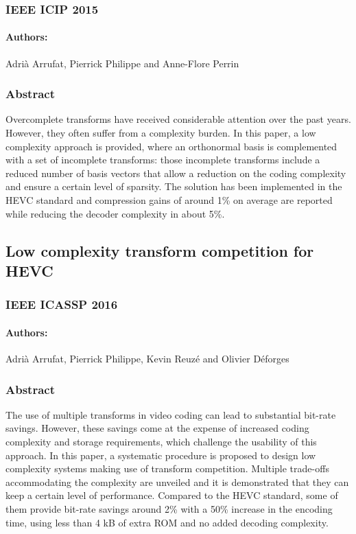 \documentclass[11pt,a4paper,openright,twoside]{book}
\numberwithin{equation}{section} %
\numberwithin{figure}{section} %
\numberwithin{table}{section} %
\begin{document}
\subsubsection*{IEEE ICIP 2015}
\paragraph{\textsf{Authors:}}
	Adrià Arrufat, Pierrick Philippe and Anne-Flore Perrin
\subsubsection*{Abstract}

Overcomplete transforms have received considerable attention over the past
years.
However, they often suffer from a complexity burden.
In this paper, a low complexity approach is provided, where an orthonormal
basis is complemented with a set of incomplete transforms: those incomplete
transforms include a reduced number of basis vectors that allow a reduction on
the coding complexity and ensure a certain level of sparsity.
The solution has been implemented in the \acs{HEVC}  standard and compression
gains of around 1\% on average are reported while reducing the decoder
complexity in about 5\%.

\subsection*{Low complexity transform competition for HEVC}
\subsubsection{IEEE ICASSP 2016}
\paragraph{\textsf{Authors:}}
	Adrià Arrufat, Pierrick Philippe, Kevin Reuzé and Olivier Déforges
\subsubsection*{Abstract}

The use of multiple transforms in video coding can lead to substantial
bit-rate savings.
However, these savings come at the expense of increased coding complexity
and storage requirements, which challenge the usability of this approach.
In this paper, a systematic procedure is proposed to design low complexity
systems making use of transform competition.
Multiple trade-offs accommodating the complexity are unveiled and it is
demonstrated that they can keep a certain level of performance.
Compared to the \acs{HEVC} standard, some of them provide bit-rate savings
around 2\% with a 50\% increase in the encoding time, using less than 4 kB
of extra ROM and no added decoding complexity.
\end{document}
